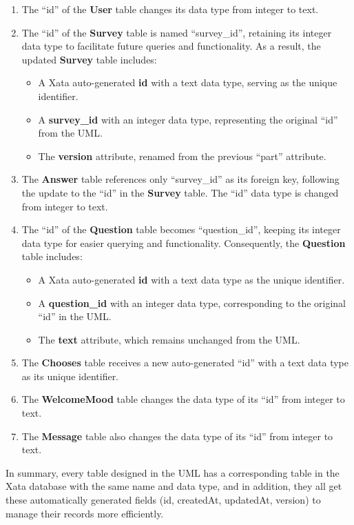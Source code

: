 \begin{enumerate}
    \item The ``id'' of the \textbf{User} table changes its data type from integer to text.
    \item The ``id'' of the \textbf{Survey} table is named ``survey\_id'', retaining its integer data type to facilitate future queries and functionality. As a result, the updated \textbf{Survey} table includes:
    \begin{itemize}
        \item A Xata auto-generated \textbf{id} with a text data type, serving as the unique identifier.
        \item A \textbf{survey\_id} with an integer data type, representing the original ``id'' from the UML.
        \item The \textbf{version} attribute, renamed from the previous ``part'' attribute.
    \end{itemize}
    \item The \textbf{Answer} table references only ``survey\_id'' as its foreign key, following the update to the ``id'' in the \textbf{Survey} table. The ``id'' data type is changed from integer to text.
    \item The ``id'' of the \textbf{Question} table becomes ``question\_id'', keeping its integer data type for easier querying and functionality. Consequently, the \textbf{Question} table includes:
    \begin{itemize}
        \item A Xata auto-generated \textbf{id} with a text data type as the unique identifier.
        \item A \textbf{question\_id} with an integer data type, corresponding to the original ``id'' in the UML.
        \item The \textbf{text} attribute, which remains unchanged from the UML.
    \end{itemize}
    \item The \textbf{Chooses} table receives a new auto-generated ``id'' with a text data type as its unique identifier.
    \item The \textbf{WelcomeMood} table changes the data type of its ``id'' from integer to text.
    \item The \textbf{Message} table also changes the data type of its ``id'' from integer to text.
\end{enumerate}

\noindent In summary, every table designed in the UML has a corresponding table in the Xata database with the same name and data type, and in addition, they all get these automatically generated fields (id, createdAt, updatedAt, version) to manage their records more efficiently.

